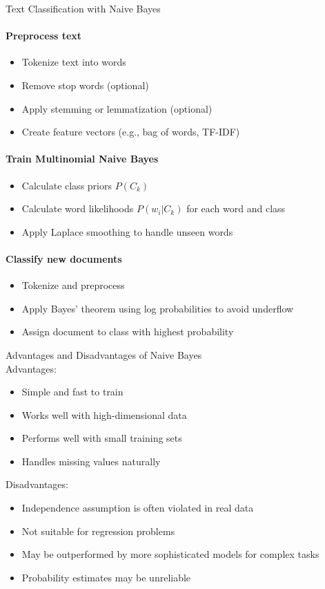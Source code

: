 \begin{KR}{Text Classification with Naive Bayes}\\
\paragraph{Preprocess text}
\begin{itemize}
    \item Tokenize text into words
    \item Remove stop words (optional)
    \item Apply stemming or lemmatization (optional)
    \item Create feature vectors (e.g., bag of words, TF-IDF)
\end{itemize}

\paragraph{Train Multinomial Naive Bayes}
\begin{itemize}
    \item Calculate class priors $P(C_k)$
    \item Calculate word likelihoods $P(w_i|C_k)$ for each word and class
    \item Apply Laplace smoothing to handle unseen words
\end{itemize}

\paragraph{Classify new documents}
\begin{itemize}
    \item Tokenize and preprocess
    \item Apply Bayes' theorem using log probabilities to avoid underflow
    \item Assign document to class with highest probability
\end{itemize}
\end{KR}

\begin{concept}{Advantages and Disadvantages of Naive Bayes}\\
Advantages:
\begin{itemize}
    \item Simple and fast to train
    \item Works well with high-dimensional data
    \item Performs well with small training sets
    \item Handles missing values naturally
\end{itemize}
Disadvantages:
\begin{itemize}
    \item Independence assumption is often violated in real data
    \item Not suitable for regression problems
    \item May be outperformed by more sophisticated models for complex tasks
    \item Probability estimates may be unreliable
\end{itemize}
\end{concept}